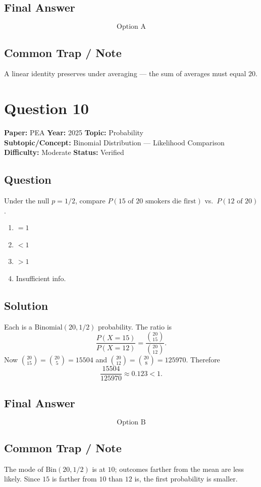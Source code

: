 \documentclass[11pt]{article}
\begin{document}
\subsection*{Final Answer}
\[
\boxed{\text{Option A}}
\]

\subsection*{Common Trap / Note}
A linear identity preserves under averaging --- the sum of averages must equal $20$.

\section*{Question 10}
\textbf{Paper:} PEA \quad \textbf{Year:} 2025 \quad \textbf{Topic:} Probability \\
\textbf{Subtopic/Concept:} Binomial Distribution --- Likelihood Comparison \\
\textbf{Difficulty:} Moderate \quad \textbf{Status:} Verified

\subsection*{Question}
Under the null $p = 1/2$, compare $P(\text{15 of 20 smokers die first})$ vs.\ $P(\text{12 of 20})$.
\begin{enumerate}[label=(\Alph*)]
\item $=1$ \item $<1$ \item $>1$ \item Insufficient info.
\end{enumerate}

\subsection*{Solution}
Each is a $\mathrm{Binomial}(20,1/2)$ probability. The ratio is
\[
\frac{P(X=15)}{P(X=12)} = \frac{\binom{20}{15}}{\binom{20}{12}}.
\]
Now $\binom{20}{15} = \binom{20}{5} = 15504$ and $\binom{20}{12} = \binom{20}{8} = 125970$. Therefore
\[
\frac{15504}{125970} \approx 0.123 < 1.
\]

\subsection*{Final Answer}
\[
\boxed{\text{Option B}}
\]

\subsection*{Common Trap / Note}
The mode of $\mathrm{Bin}(20,1/2)$ is at $10$; outcomes farther from the mean are less likely. Since $15$ is farther from $10$ than $12$ is, the first probability is smaller.
\end{document}
